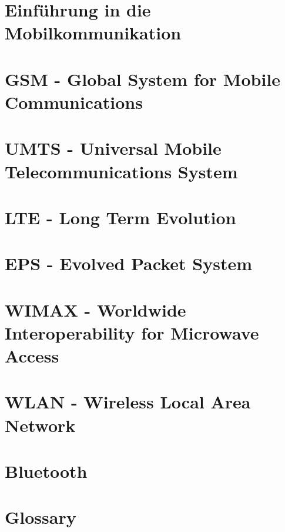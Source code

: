 \documentclass[10pt,twoside,a4paper,fleqn]{article}
\begin{document}
\begin{titlepage}
	\maketitle

	\vspace{100mm}

	\thispagestyle{empty} %
\end{titlepage}
\setcounter{tocdepth}{2}
\tableofcontents 

\newpage

\section{Einführung in die Mobilkommunikation}

\section{GSM - Global System for Mobile Communications}

\section{UMTS - Universal Mobile Telecommunications System}

\section{LTE - Long Term Evolution}


\section{EPS - Evolved Packet System}

\section{WIMAX - Worldwide Interoperability for Microwave Access}

\section{WLAN - Wireless Local Area Network}

\section{Bluetooth}


\appendix
\section{Glossary}

\end{document}
